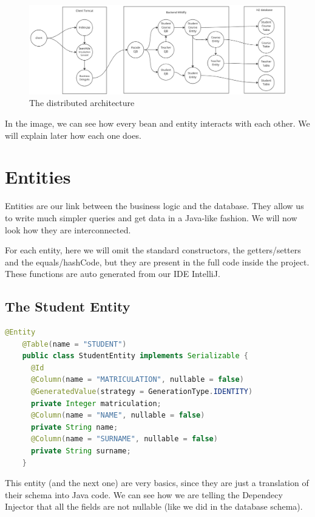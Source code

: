 \documentclass[12pt, a4paper]{article}
\begin{document}
  \begin{figure}[H]
    \centering
    \includegraphics[width=\columnwidth]{architecture.png}
    \caption{The distributed architecture}
  \end{figure}

  In the image, we can see how every bean and entity interacts with each other. We will explain later how each one does.

  \pagebreak
  \section{Entities}

  Entities are our link between the business logic and the database. They allow us to write much simpler queries and get data in a Java-like fashion. We will now look how they are interconnected.

  For each entity, here we will omit the standard constructors, the getters/setters and the equals/hashCode, but they are present in the full code inside the project. These functions are auto generated from our IDE IntelliJ.

  \subsection{The Student Entity}
  \begin{lstlisting}[language=java, caption={The Student Entity}]
    @Entity
    @Table(name = "STUDENT")
    public class StudentEntity implements Serializable {
      @Id
      @Column(name = "MATRICULATION", nullable = false)
      @GeneratedValue(strategy = GenerationType.IDENTITY)
      private Integer matriculation;
      @Column(name = "NAME", nullable = false)
      private String name;
      @Column(name = "SURNAME", nullable = false)
      private String surname;
    }
  \end{lstlisting}

  This entity (and the next one) are very basics, since they are just a translation of their schema into Java code. We can see how we are telling the Dependecy Injector that all the fields are not nullable (like we did in the database schema).
\end{document}
